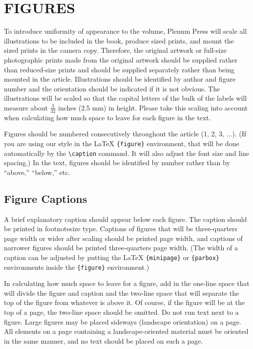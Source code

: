 \documentclass[12pt]{book}
\begin{document}
\section{FIGURES}

To introduce uniformity of appearance to the volume, Plenum Press
will scale all illustrations to be included in the book, produce
sized prints, and mount the sized prints in the camera copy.
Therefore, the original artwork or full-size photographic prints
made from the original artwork should be supplied rather than
reduced-size prints and should be supplied separately rather than
being mounted in the article. Illustrations should be identified by
author and figure number and the orientation should be indicated if
it is not obvious. The illustrations will be scaled so that the
capital letters of the bulk of the labels will measure about
$\frac3{32}$
inches (2.5 mm) in height. Please take this scaling into account
when calculating how much space to leave for each figure in the
text.

Figures should be numbered consecutively throughout the article
(1, 2, 3, ...). (If you are using our style in the {\LaTeX}
\verb+{figure}+ environment, that will be done automatically by the
\verb+\caption+ command. It will also adjust the font size and line
spacing.) In the text, figures should be identified by number
rather than by ``above,'' ``below,'' etc.

\subsection{Figure Captions}

A brief explanatory caption should appear below each figure. The
caption should be printed in footnotesize type. Captions of figures
that will be three-quarters page width or wider after scaling
should be printed page width, and captions of narrower figures
should be printed three-quarters page width. (The width of a
caption can be adjusted by putting the {\LaTeX} \verb+{minipage}+
or \verb+{parbox}+ environments inside the \verb+{figure}+
environment.)

In calculating how much space to leave for a figure, add in the
one-line space that will divide the figure and caption and the
two-line space that will separate the top of the figure from
whatever is above it. Of course, if the figure will be at the top
of a page, the two-line space should be omitted. Do not run text
next to a figure. Large figures may be placed sideways (landscape
orientation) on a page. All elements on a page containing a
landscape-oriented material must be oriented in the same manner,
and no text should be placed on such a page.
\end{document}
